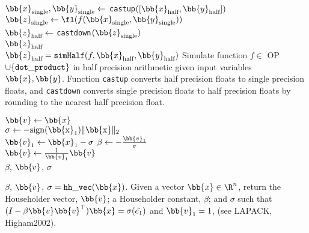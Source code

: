 \begin{algorithm2e}
	\DontPrintSemicolon %
	$\bb{x}_{\text{single}}, \bb{y}_{\text{single}} \gets$ {\tt castup}$([\bb{x}_{\text{half}},\bb{y}_{\text{half}}])$\\
	$\bb{z}_{\text{single}} \gets \fl(f(\bb{x}_{\text{single}}, \bb{y}_{\text{single}}))$\\
	$\bb{z}_{\text{half}} \gets$ {\tt castdown}$(\bb{z}_{\text{single}})$\\
	\Return $\bb{z}_{\text{half}}$\\
	\caption{$\bb{z}_{\text{half}} = {\tt simHalf}(f, \bb{x}_{\text{half}}, \bb{y}_{\text{half}})$ Simulate function $f\in$ OP$\cup \{{\tt dot\_product} \}$ in half precision arithmetic given input variables $\bb{x},\bb{y}$. Function {\tt castup} converts half precision floats to single precision floats, and {\tt castdown} converts single precision floats to half precision floats by rounding to the nearest half precision float.}
	\label{algo:simulate}
\end{algorithm2e}


\begin{algorithm2e}
	\DontPrintSemicolon %
	$\bb{v}\gets \bb{x}$\\
	$\sigma \gets -\rm{sign}(\bb{x}_1)\|\bb{x}\|_2$\\
	$\bb{v}_1 \gets \bb{x}_1-\sigma$  
	$\beta \gets -\frac{\bb{v}_1}{\sigma}$\\
	$\bb{v} \gets \frac{1}{\bb{v}_1}\bb{v}$\\
	\Return $\beta$, $\bb{v}$, $\sigma$
	\caption{$\beta$, $\bb{v}$, $\sigma = {\tt hh\_vec}(\bb{x})$. Given a vector $\bb{x}\in\R^n$, return the Householder vector, $\bb{v}$; a Householder constant, $\beta$; and $\sigma$ such that $(I-\beta \bb{v}\bb{v}^{\top})\bb{x} =\sigma(\hat{e_1})$ and $\bb{v}_1=1$, (see {LAPACK, Higham2002}).}
	\label{algo:hh_v2}
\end{algorithm2e}

